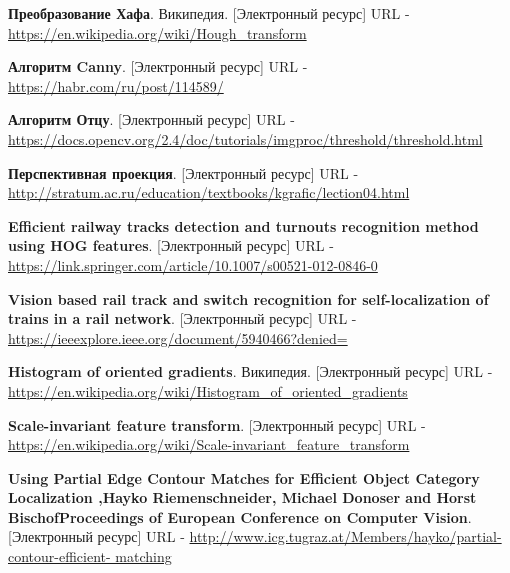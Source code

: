 \newpage
{}
\begin{thebibliography}{2}
	\textbf{Преобразование Хафа}. Википедия. [Электронный ресурс] URL - 
	\href{https://en.wikipedia.org/wiki/Hough\_transform}{https://en.wikipedia.org/wiki/Hough\_transform}
	
	\textbf{Алгоритм Canny}. [Электронный ресурс] URL - 
	\href{https://habr.com/ru/post/114589/}{https://habr.com/ru/post/114589/}
	
	\textbf{Алгоритм Отцу}. [Электронный ресурс] URL - 
	\href{https://docs.opencv.org/2.4/doc/tutorials/imgproc/threshold/threshold.html}{https://docs.opencv.org/2.4/doc/tutorials/imgproc/threshold/threshold.html}
	
	\textbf{Перспективная проекция}. [Электронный ресурс] URL - 
	\href{http://stratum.ac.ru/education/textbooks/kgrafic/lection04.html}{http://stratum.ac.ru/education/textbooks/kgrafic/lection04.html}
	
	\textbf{Efficient railway tracks detection and turnouts recognition method using HOG features}. [Электронный ресурс] URL - 
	\href{https://link.springer.com/article/10.1007/s00521-012-0846-0}{https://link.springer.com/article/10.1007/s00521-012-0846-0}
	
	\textbf{Vision based rail track and switch recognition for self-localization of trains in a rail network}. [Электронный ресурс] URL - 
	\href{https://ieeexplore.ieee.org/document/5940466?denied=}{https://ieeexplore.ieee.org/document/5940466?denied=}
	
	\textbf{Histogram of oriented gradients}. Википедия. [Электронный ресурс] URL - 
	\href{https://en.wikipedia.org/wiki/Histogram_of_oriented_gradients}{https://en.wikipedia.org/wiki/Histogram\_of\_oriented\_gradients}
	
	\textbf{Scale-invariant feature transform}. [Электронный ресурс] URL - 
	\href{https://en.wikipedia.org/wiki/Scale-invariant_feature_transform}{https://en.wikipedia.org/wiki/Scale-invariant\_feature\_transform}
	
	\textbf{Using Partial Edge Contour Matches for Efficient Object Category
		Localization ,Hayko Riemenschneider, Michael Donoser and Horst
		BischofProceedings of European Conference on Computer Vision}. [Электронный ресурс] URL - 
	\href{http://www.icg.tugraz.at/Members/hayko/partial-contour-efficient-
		matching}{http://www.icg.tugraz.at/Members/hayko/partial-contour-efficient-
		matching}
	

\end{thebibliography}
